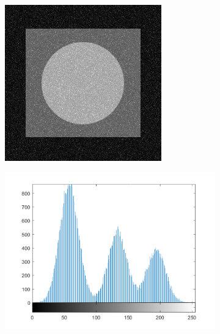 \begin{figure}[h]
\begin{subfigure}[b]{0.25\linewidth}
		\caption{}
		\label{fig:add_rayleigh}
	\end{subfigure}
  	\begin{subfigure}[b]{0.25\linewidth}
		\includegraphics[width=\linewidth]{myfigure/p4/41-gamma.png}
		\caption{}
		\label{fig:add_gamma}
	\end{subfigure}
  	\begin{subfigure}[b]{0.25\linewidth}
		\includegraphics[width=\linewidth]{myfigure/p4/41-gaussian-hist.png}

\end{subfigure}
\end{figure}
